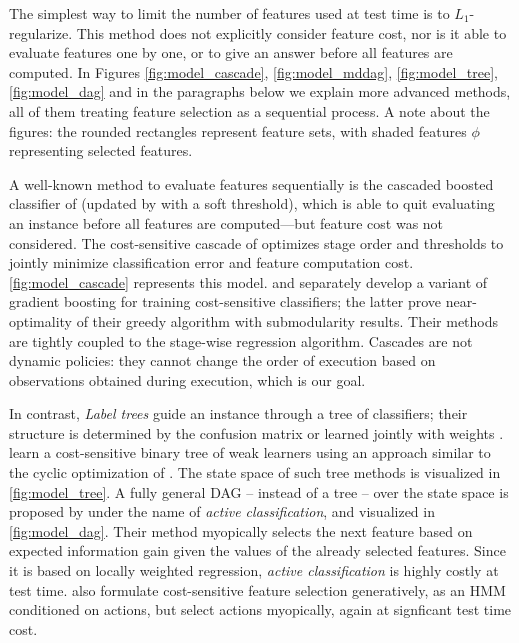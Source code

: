 The simplest way to limit the number of features used at test time is to $L_1$-regularize.
This method does not explicitly consider feature cost, nor is it able to evaluate features one by one, or to give an answer before all features are computed.
In Figures \ref{fig:model_cascade}, \ref{fig:model_mddag}, \ref{fig:model_tree}, \ref{fig:model_dag} and in the paragraphs below we explain more advanced methods, all of them treating feature selection as a sequential process.
A note about the figures: the rounded rectangles represent feature sets, with shaded features $\phi$ representing selected features.

A well-known method to evaluate features sequentially is the cascaded boosted classifier of \cite{Viola-IJCV-2004} (updated by \cite{Bourdev-CVPR-2005} with a soft threshold), which is able to quit evaluating an instance before all features are computed---but feature cost was not considered.
The cost-sensitive cascade of \cite{Chen-AISTATS-2012} optimizes stage order and thresholds to jointly minimize classification error and feature computation cost.
\autoref{fig:model_cascade} represents this model.
\cite{Xu-ICML-2012} and \cite{Grubb-AISTATS-2012} separately develop a variant of gradient boosting for training cost-sensitive classifiers; the latter prove near-optimality of their greedy algorithm with submodularity results.
Their methods are tightly coupled to the stage-wise regression algorithm.
Cascades are not dynamic policies: they cannot change the order of execution based on observations obtained during execution, which is our goal.

In contrast, \emph{Label trees} guide an instance through a tree of classifiers; their structure is determined by the confusion matrix or learned jointly with weights \parencite{Deng-NIPS-2011}.
\cite{Xu-ICML-2013} learn a cost-sensitive binary tree of weak learners using an approach similar to the cyclic optimization of \parencite{Chen-AISTATS-2012}.
The state space of such tree methods is visualized in \autoref{fig:model_tree}.
A fully general DAG -- instead of a tree  -- over the state space is proposed by \cite{Gao-NIPS-2011} under the name of \emph{active classification}, and visualized in \autoref{fig:model_dag}.
Their method myopically selects the next feature based on expected information gain given the values of the already selected features.
Since it is based on locally weighted regression, \emph{active classification} is highly costly at test time.
\cite{Ji-PR-2007} also formulate cost-sensitive feature selection generatively, as an HMM conditioned on actions, but select actions myopically, again at signficant test time cost.

